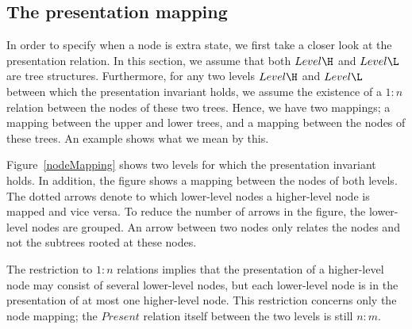 







%																
\subsection{The presentation mapping}\label{mappingsInLayer}


In order to specify when a node is extra state, we first take a closer look at the presentation relation. In this section, we assume that both $Level\H$ and $Level\L$ are tree structures. Furthermore, for any two levels $Level\H$ and $Level\L$ between which the presentation invariant holds, we assume the existence of a $1:n$ relation between the nodes of these two trees. Hence, we have two mappings; a mapping between the upper and lower trees, and a mapping between the nodes of these trees. An example shows what we mean by this.

Figure~\ref{nodeMapping} shows two levels for which the presentation invariant holds. In addition, the figure shows a mapping between the nodes of both levels. The dotted arrows denote to which lower-level nodes a higher-level node is mapped and vice versa. To reduce the number of arrows in the figure, the lower-level nodes are grouped. An arrow between two nodes only relates the nodes and not the subtrees rooted at these nodes. %

The restriction to $1:n$ relations implies that the presentation of a higher-level node may consist of several lower-level nodes, but each lower-level node is in the presentation of at most one higher-level node. This restriction concerns only the node mapping; the $Present$ relation itself between the two levels is still $n:m$. 

